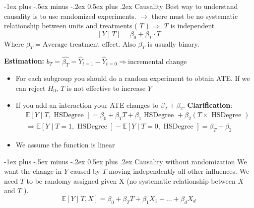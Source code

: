 \documentclass[7pt,landscape]{article}
\makeatletter
\renewcommand{\section}{\@startsection{section}{1}{0mm}%
                                {-1ex plus -.5ex minus -.2ex}%
                                {0.5ex plus .2ex}%
                                {\large\bfseries}}
\renewcommand{\subsection}{\@startsection{subsection}{2}{0mm}%
                                {-1ex plus -.5ex minus -.2ex}%
                                {0.5ex plus .2ex}%
                                {\bfseries}}
\theoremstyle{def}
\makeatother
\begin{document}
\begin{multicols}{3}
    \setlength{\premulticols}{1pt}
    \setlength{\postmulticols}{1pt}
    \setlength{\multicolsep}{0.5pt}
    \setlength{\columnsep}{1pt}

    \section{Causality}
    Best way to understand causality is to use randomized experiments.
    \( \to \) there must be no systematic relationship between units and treatments ( \( T \) ) \( \Rightarrow \) \( T \) is independent \\

    \[
        \left[ Y  \mid  T \right] = \beta_{0} + \beta_{T} \cdot T
    \]
    Where \( \beta_{T} = \text{Average treatment effect} \). Also \( \beta_{T} \) is usually binary.

    \textbf{Estimation: } \( b_{T} =\hat{\beta_T} =\hat{Y}_{t=1} -\hat{Y}_{t=0} \Rightarrow \text{incremental change} \)

    \begin{itemize}
        \item For each subgroup you should do a random experiment to obtain ATE. If we can reject \( H_{0} \), \( T \) is not effective to increase \( Y \)
        \item If you add an interaction your ATE changes to \( \beta_T + \beta_2 \). \textbf{Clarification}:
              {\tiny
              \setlength{\abovedisplayskip}{6pt}
              \setlength{\belowdisplayskip}{\abovedisplayskip}
              \setlength{\abovedisplayshortskip}{0pt}
              \setlength{\belowdisplayshortskip}{3pt}
              \[
                  \begin{aligned}
                       & \mathbb{E}[Y \mid T, \text { HSDegree }]=\beta_{0}+\beta_{T} T+\beta_{1} \text { HSDegree }+\beta_{2}(T \times \text { HSDegree }) \\
                       & \Rightarrow \mathbb{E}[Y \mid T=1, \text { HSDegree }]-\mathbb{E}[Y \mid T=0, \text { HSDegree }]=\beta_{T}+\beta_{2}
                  \end{aligned}
              \]
              }%
        \item We assume the function is linear
    \end{itemize}

    \subsection{Causality without randomization}
    We want the change in \( Y \) caused by \( T \) moving independently all other influences. We need \( T \) to be randomy assigned given X (no systematic relationship between \( X  \) and \( T \) ).
    \[
        \mathbb{E}\left[ Y  \mid T, X  \right] = \beta_0 + \beta_{T} T + \beta_1 X_1 + \ldots + \beta_d X_d
    \]

\end{multicols}
\end{document}

